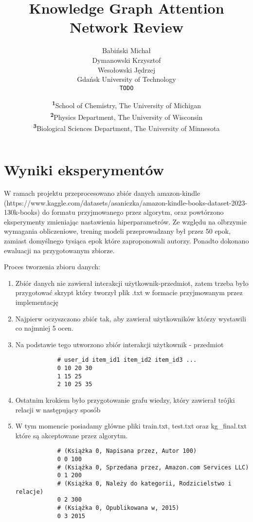 \documentclass[a4paper]{LTJournalArticle}
\title{Knowledge Graph Attention Network Review}
\author{Babiński Michał \\
        Dymanowski Krzysztof \\
        Wesołowski Jędrzej \\
        Gdańsk University of Technology \\
        \texttt{TODO}}
\date{\footnotesize\textsuperscript{\textbf{1}}School of Chemistry, The University of Michigan\\ \textsuperscript{\textbf{2}}Physics Department, The University of Wisconsin\\ \textsuperscript{\textbf{3}}Biological Sciences Department, The University of Minnesota}
\begin{document}
	
	\maketitle %
	

	\section{Wyniki eksperymentów}
	W ramach projektu przeprocesowano zbiór danych amazon-kindle (https://www.kaggle.com/datasets/asaniczka/amazon-kindle-books-dataset-2023-130k-books) do formatu przyjmowanego przez algorytm, oraz powtórzono eksperymenty zmieniając nastawienia hiperparametrów. Ze względu na olbrzymie wymagania obliczeniowe, trening modeli przeprowadzany był przez 50 epok, zamiast domyślnego tysiąca epok które zaproponowali autorzy. Ponadto dokonano ewaluacji na przygotowanym zbiorze.
	
	
	Proces tworzenia zbioru danych:
	\begin{enumerate}
		\item Zbiór danych nie zawierał interakcji użytkownik-przedmiot, zatem trzeba było przygotować skrypt który tworzył plik .txt w formacie przyjmowanym przez implementację
		
		\item Najpierw oczyszczono zbiór tak, aby zawierał użytkowników którzy wystawili co najmniej 5 ocen.
		
		\item Na podstawie tego utworzono zbiór interakcji użytkownik - przedmiot  
		
		\begin{verbatim}
			# user_id item_id1 item_id2 item_id3 ...
			0 10 20 30
			1 15 25
			2 10 25 35
		\end{verbatim}

	
		\item Ostatnim krokiem było przygotowanie grafu wiedzy, który zawierał trójki relacji w następujący sposób  

	
		\item W tym momencie posiadamy główne pliki train.txt, test.txt oraz kg\_final.txt które są akceptowane przez algorytm.
		
		\begin{verbatim}
			# (Książka 0, Napisana przez, Autor 100)
			0 0 100   
			# (Książka 0, Sprzedana przez, Amazon.com Services LLC)
			0 1 200   
			# (Książka 0, Należy do kategorii, Rodzicielstwo i relacje)
			0 2 300   
			# (Książka 0, Opublikowana w, 2015)
			0 3 2015  
		\end{verbatim}
	
	\end{enumerate}
\end{document}
